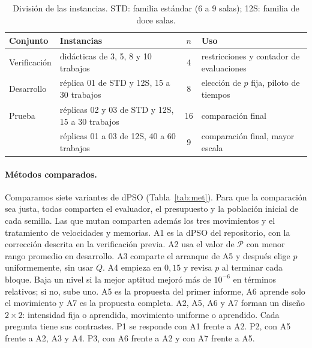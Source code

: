 \documentclass[10pt,a4paper]{article}
\newcommand{\dc}{{,}}%
\begin{document}
\begin{table}[htb]
\centering\small
\caption{División de las instancias. STD: familia estándar (6 a 9 salas); 12S: familia de doce salas.}
\label{tab:inst}
\begin{tabular}{@{}llcl@{}}
\toprule
Conjunto & Instancias & $n$ & Uso \\
\midrule
Verificación & didácticas de 3, 5, 8 y 10 trabajos & 4 & restricciones y contador de evaluaciones \\
Desarrollo & réplica 01 de STD y 12S, 15 a 30 trabajos & 8 & elección de $p$ fija, piloto de tiempos \\
Prueba & réplicas 02 y 03 de STD y 12S, 15 a 30 trabajos & 16 & comparación final \\
       & réplicas 01 a 03 de 12S, 40 a 60 trabajos & 9 & comparación final, mayor escala \\
\bottomrule
\end{tabular}
\end{table}

\paragraph{Métodos comparados.}
Comparamos siete variantes de dPSO (Tabla~\ref{tab:met}). Para que la comparación sea justa,
todas comparten el evaluador, el presupuesto y la población inicial de cada semilla. Las que
mutan comparten además los tres movimientos y el tratamiento de velocidades y memorias. A1 es
la dPSO del repositorio, con la corrección descrita en la verificación previa. A2 usa el valor de $\mathcal{P}$ con menor rango promedio en
desarrollo. A3 comparte el arranque de A5 y después elige $p$ uniformemente, sin usar $Q$. A4
empieza en $0\dc15$ y revisa $p$ al terminar cada bloque. Baja un nivel si la mejor aptitud
mejoró más de $10^{-6}$ en términos relativos; si no, sube uno. A5 es la propuesta del primer
informe, A6 aprende solo el movimiento y A7 es la propuesta completa. A2, A5, A6 y A7 forman un
diseño $2\times2$: intensidad fija o aprendida, movimiento uniforme o aprendido. Cada pregunta
tiene sus contrastes. P1 se responde con A1 frente a A2. P2, con A5 frente a A2, A3 y A4. P3,
con A6 frente a A2 y con A7 frente a A5.
\end{document}
